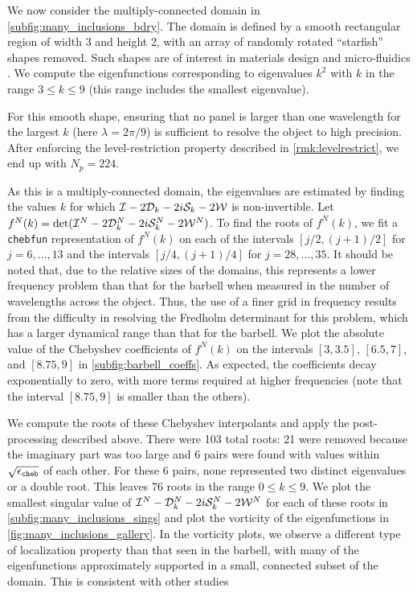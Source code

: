 We now consider the multiply-connected domain in
\cref{subfig:many_inclusions_bdry}.
% 
The domain is defined by a smooth rectangular region
of width 3 and height 2,
with an array of randomly rotated ``starfish'' shapes
removed. 
%
Such shapes are of interest in
materials design and micro-fluidics .
%
We compute the eigenfunctions corresponding to
eigenvalues $k^2$ with $k$ in the range
$3 \leq k \leq 9$ (this range includes the smallest
eigenvalue).

%
For this smooth shape, ensuring that no panel is
larger than one wavelength for the largest $k$
(here $\lambda=2\pi/9$) is sufficient to resolve
the object to high precision.
%
After enforcing the
level-restriction property described in
\cref{rmk:levelrestrict}, we end up with
$N_p = 224$.

As this is a multiply-connected domain,
the eigenvalues are estimated by finding the values
$k$ for which $\mathcal I-2{\mathcal D}_{k}-2i{\mathcal S}_k-2{\mathcal W}$ is non-invertible.
%
Let $f^N(k) = \det (\mathcal I^N-2{\mathcal D}_{k}^N-2i{\mathcal S}_k^N-2{\mathcal W}^N)$.
To find the roots of $f^N(k)$, we fit a \texttt{chebfun}
representation of $f^N(k)$ on each of the intervals
$[j/2,(j+1)/2]$ for $j = 6,\ldots,13$ and the intervals
$[j/4,(j+1)/4]$ for $j = 28,\ldots,35$.
%
It should be noted that, due to the relative sizes
of the domains,
this represents a lower frequency problem than
that for the barbell when measured in the number
of wavelengths across the object.
%
Thus, the use of a finer grid in frequency results from
the difficulty in resolving the Fredholm determinant
for this problem, which has a larger dynamical range
than that for the barbell.
%
We plot the absolute value of the Chebyshev coefficients
of $f^N(k)$ on the intervals $[3,3.5]$, $[6.5,7]$,
and $[8.75,9]$ in \cref{subfig:barbell_coeffs}.
%
As expected, the coefficients decay exponentially
to zero, with more terms required at higher
frequencies (note that the interval $[8.75,9]$ is
smaller than the others).
%

We compute the roots of these Chebyshev interpolants
and apply the post-processing described above.
%
There were 103 total roots: 21 were removed because
the imaginary part was too large and 6 pairs were found
with values within $\sqrt{{\epsilon_{\texttt{cheb}}}}$ of each other.
%
For these 6 pairs, none represented two distinct
eigenvalues or a double root.
%
This leaves 76 roots in the range $0\leq k \leq 9$.
%
We plot the smallest singular value of
$\mathcal I^N-{\mathcal D}_{k}^N-2i{\mathcal S}_k^N-2{\mathcal W}^N$ for each of these roots in
\cref{subfig:many_inclusions_sings}
and plot the vorticity of the eigenfunctions
in \cref{fig:many_inclusions_gallery}.
%
In the vorticity plots, we observe a different type of
localization property than that seen in the barbell,
with many of the eigenfunctions
approximately supported in a small, connected subset
of the domain. This is consistent with other studies

